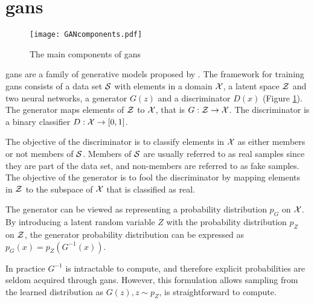 
\section{\acrlong{gans}}

\begin{figure}[t]
    \centering
    \texttt{[image: GANcomponents.pdf]}
    \caption{The main components of \acrshort{gans}}
    \label{fig:GAN}
\end{figure}

\acrfull{gans} are a family of generative models proposed by \textcite{goodfellow2014generative}. The framework for training \acrshort{gans} consists of a data set $\mathcal{S}$ with elements in a domain $\mathcal{X}$, a latent space $\mathcal{Z}$ and two neural networks, a generator $G(z)$ and a discriminator $D(x)$ (Figure \ref{fig:GAN}). The generator maps elements of $\mathcal{Z}$ to $\mathcal{X}$, that is $G: \mathcal{Z} \rightarrow \mathcal{X}$. The discriminator is a binary classifier $D: \mathcal{X} \rightarrow [0, 1]$. 

The objective of the discriminator is to classify elements in $\mathcal{X}$ as either members or not members of $\mathcal{S}$. Members of $\mathcal{S}$ are usually referred to as real samples since they are part of the data set, and non-members are referred to as fake samples. The objective of the generator is to fool the discriminator by mapping elements in $\mathcal{Z}$ to the subspace of $\mathcal{X}$ that is classified as real. 

The generator can be viewed as representing a probability distribution $p_G$ on $\mathcal{X}$. By introducing a latent random variable $Z$ with the probability distribution $p_Z$ on $\mathcal{Z}$, the generator probability distribution can be expressed as $p_G(x) = p_Z(G^{-1}(x))$. 

In practice $G^{-1}$ is intractable to compute, and therefore explicit probabilities are seldom acquired through \acrshort{gans}. However, this formulation allows sampling from the learned distribution as $G(z), z \sim p_Z$, is straightforward to compute. 

